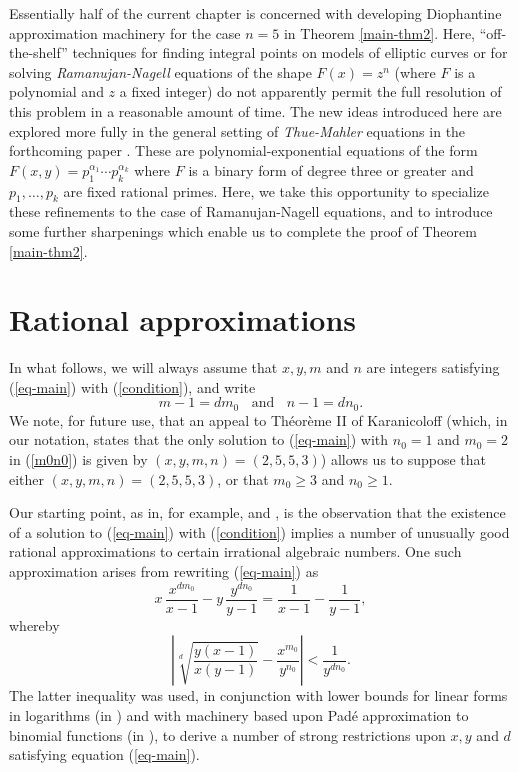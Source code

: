 Essentially half of the current chapter is concerned with developing Diophantine approximation machinery for the case $n=5$ in Theorem \ref{main-thm2}. Here, ``off-the-shelf'' techniques for finding integral points on models of elliptic curves or for solving {\it Ramanujan-Nagell} equations of the shape $F(x)=z^n$ (where $F$ is a polynomial and $z$ a fixed integer) do not apparently permit the full resolution of this problem in a reasonable amount of time. The new ideas introduced here are explored more fully in the general setting of {\it Thue-Mahler} equations in the forthcoming paper  \cite{GhKaMaSi}. These are polynomial-exponential equations of the form $F(x,y)=p_1^{\alpha_1} \cdots p_k^{\alpha_k}$ where $F$ is a binary form of degree three or greater and $p_1, \ldots, p_k$ are fixed rational primes. Here, we take this opportunity to specialize these refinements to the case of Ramanujan-Nagell equations, and to introduce some further sharpenings which enable us to complete the proof of Theorem \ref{main-thm2}.

\section{Rational approximations} \label{proof}

In what follows, we will always assume that $x, y, m$ and $n$ are integers satisfying (\ref{eq-main}) with (\ref{condition}), and write
\begin{equation} \label{m0n0}
 m-1 = d m_0 \; \; \mbox{ and } \; \; n-1 = d n_0.
 \end{equation}
 We note, for future use, that  an appeal to Th\'eor\`eme II of Karanicoloff \cite{Ka} (which, in our notation, states that the only solution to (\ref{eq-main}) with $n_0=1$ and $m_0=2$ in (\ref{m0n0}) is given by $(x,y,m,n) = (2,5,5,3)$) allows us to suppose that either $(x,y,m,n) = (2,5,5,3)$, or that  $m_0 \geq 3$ and $n_0 \geq 1$.

Our starting point, as in, for example, \cite{BuSh} and \cite{NeSh}, is the observation that the existence of a solution to (\ref{eq-main}) with (\ref{condition}) implies a number of unusually good rational approximations to certain irrational algebraic numbers. One such approximation arises from rewriting (\ref{eq-main}) as 
$$
x \, \frac{x^{d m_0}}{x-1} - y \, \frac{y^{d n_0}}{y-1} = \frac{1}{x-1} - \frac{1}{y-1},
$$
whereby
\begin{equation} \label{good}
\left| \sqrt[d]{\frac{y(x-1)}{x(y-1)}} - \frac{x^{m_0}}{y^{n_0}} \right| < \frac{1}{y^{d n_0}}.
\end{equation}
The latter inequality was used, in conjunction with lower bounds for linear forms in logarithms (in \cite{NeSh}) and with machinery based upon Pad\'e approximation to binomial functions (in \cite{BuSh}), to derive a number of strong restrictions upon $x, y$ and $d$ satisfying equation (\ref{eq-main}).


